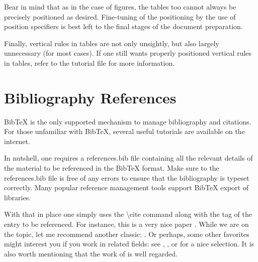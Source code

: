 Bear in mind that as in the case of figures, the tables too cannot always be
precisely positioned as desired. Fine-tuning of the positioning by the use of
position specifiers is best left to the final stages of the document
preparation.

Finally, vertical rules in tables are not only unsightly, but also largely
unnecessary (for most cases). If one still wants properly positioned vertical
rules in tables, refer to the tutorial file for more information.
%
%
%
%
\section{Bibliography References}
{Bib\TeX} is the only supported mechanism to manage bibliography and citations.
For those unfamiliar with Bib\TeX, several useful tutorials are available on
the internet.

In nutshell, one requires a {\ttfamily references.bib} file containing all the
relevant details of the material to be referenced in the {Bib\TeX} format. Make
sure to the {\ttfamily references.bib} file is free of any errors to ensure
that the bibliography is typeset correctly. Many popular reference management
tools support {Bib\TeX} export of libraries.

With that in place one simply uses the {\ttfamily \textbackslash cite} command
along with the tag of the entry to be referenced. For instance, this is a very
nice paper \cite{Stroock_Varadhan_1971}. While we are on the topic, let me
recommend another classic: \cite{Nash_1951}. Or perhaps, some other favorites
might interest you if you work in related fields: see \cite{Chernoff_1972},
\cite{Wald_2004}, \cite{Zhang_2014} or \cite{Shannon_1948} for a nice
selection. It is also worth mentioning that the work of
\cite{Polyanskiy_Poor_Verdu_2010} is well regarded.